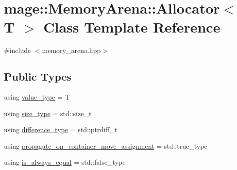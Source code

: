 \hypertarget{classmage_1_1_memory_arena_1_1_allocator}{}\section{mage\+:\+:Memory\+Arena\+:\+:Allocator$<$ T $>$ Class Template Reference}
\label{classmage_1_1_memory_arena_1_1_allocator}


{\ttfamily \#include $<$memory\+\_\+arena.\+hpp$>$}

\subsection*{Public Types}
\begin{DoxyCompactItemize}
\item 
using \mbox{\hyperlink{classmage_1_1_memory_arena_1_1_allocator_a216e8ae017f9cfeb1676839da11a1b5c}{value\+\_\+type}} = T
\item 
using \mbox{\hyperlink{classmage_1_1_memory_arena_1_1_allocator_a5b35424efcc3fb527e97dbd355d31b40}{size\+\_\+type}} = std\+::size\+\_\+t
\item 
using \mbox{\hyperlink{classmage_1_1_memory_arena_1_1_allocator_a5f2d728dd10f12d727c7572a3a270ee3}{difference\+\_\+type}} = std\+::ptrdiff\+\_\+t
\item 
using \mbox{\hyperlink{classmage_1_1_memory_arena_1_1_allocator_a00a438b50f33f4c7b68a20c994e6fc4b}{propagate\+\_\+on\+\_\+container\+\_\+move\+\_\+assignment}} = std\+::true\+\_\+type
\item 
using \mbox{\hyperlink{classmage_1_1_memory_arena_1_1_allocator_a5f25626106f2f21d37b75b271f230ae4}{is\+\_\+always\+\_\+equal}} = std\+::false\+\_\+type
\end{DoxyCompactItemize}

